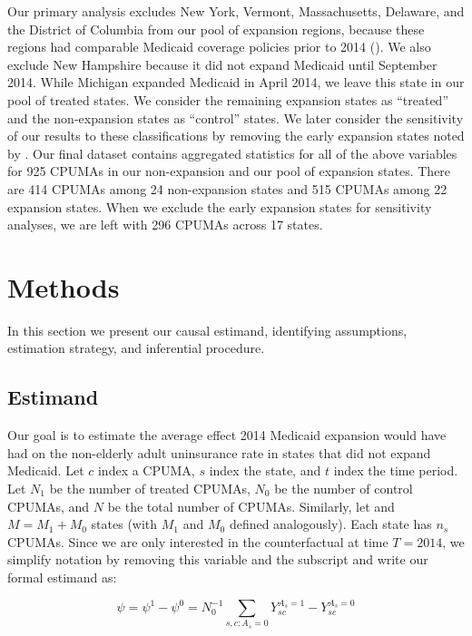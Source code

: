 \documentclass{article}
\begin{document}
Our primary analysis excludes New York, Vermont, Massachusetts, Delaware, and the District of Columbia from our pool of expansion regions, because these regions had comparable Medicaid coverage policies prior to 2014 (\cite{kaestner2017effects}). We also exclude New Hampshire because it did not expand Medicaid until September 2014. While Michigan expanded Medicaid in April 2014, we leave this state in our pool of treated states. We consider the remaining expansion states as ``treated'' and the non-expansion states as ``control'' states. We later consider the sensitivity of our results to these classifications by removing the early expansion states noted by \cite{frean2017premium}. Our final dataset contains aggregated statistics for all of the above variables for 925 CPUMAs in our non-expansion and our pool of expansion states. There are 414 CPUMAs among 24 non-expansion states and 515 CPUMAs among 22 expansion states. When we exclude the early expansion states for sensitivity analyses, we are left with 296 CPUMAs across 17 states.

\section{Methods}
\label{sec:methods}

In this section we present our causal estimand, identifying assumptions, estimation strategy, and inferential procedure.

\subsection{Estimand}

Our goal is to estimate the average effect 2014 Medicaid expansion would have had on the non-elderly adult uninsurance rate in states that did not expand Medicaid. Let $c$ index a CPUMA, $s$ index the state, and $t$ index the time period. Let $N_1$ be the number of treated CPUMAs, $N_0$ be the number of control CPUMAs, and $N$ be the total number of CPUMAs. Similarly, let and $M = M_1 + M_0$ states (with $M_1$ and $M_0$ defined analogously). Each state has $n_s$ CPUMAs. Since we are only interested in the counterfactual at time $T = 2014$, we simplify notation by removing this variable and the subscript and write our formal estimand as:

$$
\psi = \psi^1 - \psi^0 = N_0^{-1}\sum_{s, c: A_s = 0} Y_{sc}^{A_s = 1} - Y_{sc}^{A_s = 0}
$$
\end{document}
